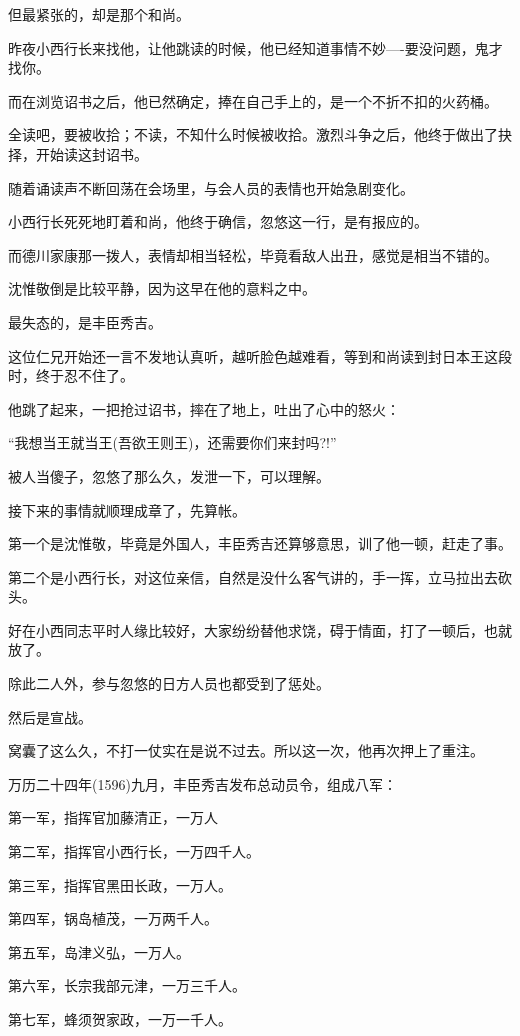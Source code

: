 \documentclass[11pt,a4paper,onecolumn]{article}
\begin{document}
但最紧张的，却是那个和尚。

昨夜小西行长来找他，让他跳读的时候，他已经知道事情不妙----要没问题，鬼才找你。

而在浏览诏书之后，他已然确定，捧在自己手上的，是一个不折不扣的火药桶。

全读吧，要被收拾；不读，不知什么时候被收拾。激烈斗争之后，他终于做出了抉择，开始读这封诏书。

随着诵读声不断回荡在会场里，与会人员的表情也开始急剧变化。

小西行长死死地盯着和尚，他终于确信，忽悠这一行，是有报应的。

而德川家康那一拨人，表情却相当轻松，毕竟看敌人出丑，感觉是相当不错的。

沈惟敬倒是比较平静，因为这早在他的意料之中。

最失态的，是丰臣秀吉。

这位仁兄开始还一言不发地认真听，越听脸色越难看，等到和尚读到封日本王这段时，终于忍不住了。

他跳了起来，一把抢过诏书，摔在了地上，吐出了心中的怒火：

``我想当王就当王(吾欲王则王)，还需要你们来封吗?!''

被人当傻子，忽悠了那么久，发泄一下，可以理解。

接下来的事情就顺理成章了，先算帐。

第一个是沈惟敬，毕竟是外国人，丰臣秀吉还算够意思，训了他一顿，赶走了事。

第二个是小西行长，对这位亲信，自然是没什么客气讲的，手一挥，立马拉出去砍头。

好在小西同志平时人缘比较好，大家纷纷替他求饶，碍于情面，打了一顿后，也就放了。

除此二人外，参与忽悠的日方人员也都受到了惩处。

然后是宣战。

窝囊了这么久，不打一仗实在是说不过去。所以这一次，他再次押上了重注。

万历二十四年(1596)九月，丰臣秀吉发布总动员令，组成八军：

第一军，指挥官加藤清正，一万人

第二军，指挥官小西行长，一万四千人。

第三军，指挥官黑田长政，一万人。

第四军，锅岛植茂，一万两千人。

第五军，岛津义弘，一万人。

第六军，长宗我部元津，一万三千人。

第七军，蜂须贺家政，一万一千人。
\end{document}

